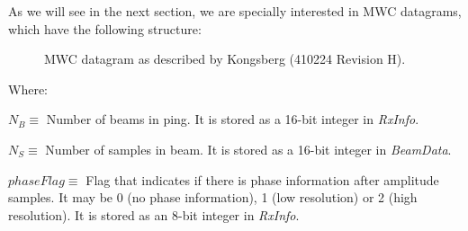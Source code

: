 \begin{table}[h!]
\footnotesize
\begin{center}
\end{center}
\caption{Multibeam datagrams of the KMALL format.}
\end{table}

As we will see in the next section, we are specially interested in MWC datagrams, which have the following structure:

\begin{figure}[H]
	\begin{center}
		\scalebox{.565}{}
	\end{center}
	\caption{MWC datagram as described by Kongsberg (410224 Revision H).}
	\label{fig:mwc_datagram}
\end{figure}

Where:
\begin{description}
	\item $N_B \equiv$ Number of beams in ping. It is stored as a 16-bit integer in \textit{RxInfo}.
	\item $N_S \equiv$ Number of samples in beam. It is stored as a 16-bit integer in \textit{BeamData}.
	\item $phaseFlag \equiv$ Flag that indicates if there is phase information after amplitude samples. It may be 0 (no phase information), 1 (low resolution) or 2 (high resolution). It is stored as an 8-bit integer in \textit{RxInfo}.
\end{description}

